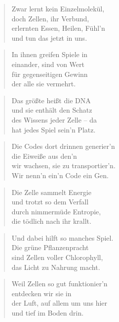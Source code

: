 \documentclass[10pt,a4paper]{article}
\begin{document}
\begin{multicols}{2}
\begin{verse}
Zwar lernt kein Einzelmolekül, \\
doch Zellen, ihr Verbund, \\
erlernten Essen, Heilen, Fühl’n \\
und tun das jetzt in uns. \\
\end{verse}

\begin{verse}
In ihnen greifen Spiele in \\
einander, sind von Wert \\
für gegenseitigen Gewinn \\
der alle sie vermehrt. \\
\end{verse}

\begin{verse}
Das größte heißt die DNA \\
und sie enthält den Schatz \\
des Wissens jeder Zelle – da \\
hat jedes Spiel sein’n Platz. \\
\end{verse}

\begin{verse}
Die Codes dort drinnen generier’n \\
die Eiweiße aus den’n \\
wir wachsen, sie zu transportier’n. \\
Wir nenn’n ein’n Code ein Gen. \\
\end{verse}

\begin{verse}
Die Zelle sammelt Energie \\
und trotzt so dem Verfall \\
durch nimmermüde Entropie, \\
die tödlich nach ihr krallt. \\
\end{verse}

\begin{verse}
Und dabei hilft so manches Spiel. \\
Die grüne Pflanzenpracht \\
sind Zellen voller Chlorophyll, \\
das Licht zu Nahrung macht. \\
\end{verse}

\begin{verse}
Weil Zellen so gut funktionier’n \\
entdecken wir sie in \\
der Luft, auf allem um uns hier \\
und tief im Boden drin. \\
\end{verse}


\end{multicols}
\end{document}
